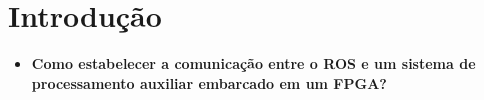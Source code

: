 \chapter{Introdução}\label{cap:intro}


\begin{itemize}
    \item \textbf{Como estabelecer a comunicação entre o ROS e um sistema de processamento auxiliar 
embarcado em um FPGA?}

\end{itemize}

\lipsum[4]








